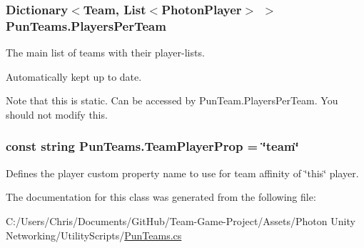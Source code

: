 \subsubsection[{\texorpdfstring{Players\+Per\+Team}{PlayersPerTeam}}]{\setlength{\rightskip}{0pt plus 5cm}Dictionary$<${\bf Team}, List$<${\bf Photon\+Player}$>$ $>$ Pun\+Teams.\+Players\+Per\+Team\hspace{0.3cm}{\ttfamily [static]}}\hypertarget{class_pun_teams_a96cd4b32e4cd5a4447c10f2a3f22a22a}{}\label{class_pun_teams_a96cd4b32e4cd5a4447c10f2a3f22a22a}


The main list of teams with their player-\/lists. 

Automatically kept up to date.

Note that this is static. Can be accessed by Pun\+Team.\+Players\+Per\+Team. You should not modify this.
\subsubsection[{\texorpdfstring{Team\+Player\+Prop}{TeamPlayerProp}}]{\setlength{\rightskip}{0pt plus 5cm}const string Pun\+Teams.\+Team\+Player\+Prop = \char`\"{}team\char`\"{}}\hypertarget{class_pun_teams_a036c6f1b595a3a4d3df5dc6566950667}{}\label{class_pun_teams_a036c6f1b595a3a4d3df5dc6566950667}


Defines the player custom property name to use for team affinity of \char`\"{}this\char`\"{} player.



The documentation for this class was generated from the following file\+:\begin{DoxyCompactItemize}
\item 
C\+:/\+Users/\+Chris/\+Documents/\+Git\+Hub/\+Team-\/\+Game-\/\+Project/\+Assets/\+Photon Unity Networking/\+Utility\+Scripts/\hyperlink{_pun_teams_8cs}{Pun\+Teams.\+cs}\end{DoxyCompactItemize}

